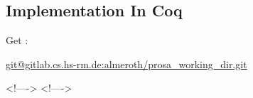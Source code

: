 
\subsection{Implementation In Coq}

Get : 

\url{git@gitlab.cs.hs-rm.de:almeroth/prosa_working_dir.git}



\newcommand{\includecode}[2][c]{<!---->}

\includecode{sched.c}
\includecode[asm]{sched.c}

